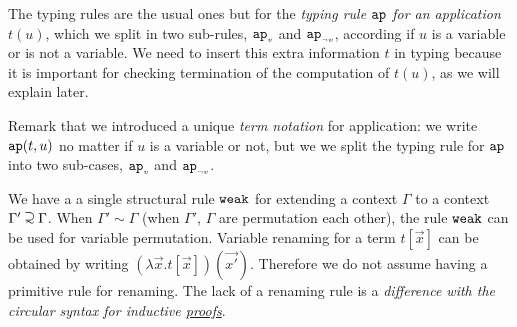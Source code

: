 The typing rules are the usual ones but for %
the \emph{typing rule ${\tt ap}$ for an application} $t(u)$, which we split in two sub-rules, ${{\tt ap}_{\mbox{\tiny $v$}}}$
and ${{\tt ap}_{\mbox{\tiny $\neg v$}}}$, according if $u$ is a variable or is not a variable.
We need to insert this extra information $t$ in typing because it is important for checking termination
of the computation of $t(u)$, as we will explain later.

Remark that we introduced a unique \emph{term notation}
for application: we write ${\tt ap}(t,u)$ no matter if $u$ is a variable or not, but we we split 
the typing rule for ${\tt ap}$ into two sub-cases, ${{\tt ap}_{\mbox{\tiny $v$}}}$ and ${{\tt ap}_{\mbox{\tiny $\neg v$}}}$.

We have a a single structural rule ${\tt weak}$ for extending a context $\Gamma$ to a context 
$\Gamma' \supseteqsim \Gamma$. When $\Gamma' \sim \Gamma$ (when 
$\Gamma'$, $\Gamma$ are permutation each other), 
the rule ${\tt weak}$ can be used for variable permutation.
Variable renaming for a term $t[\vec{x}]$ can be obtained by writing 
$(\lambda \vec{x}.t[\vec{x}])(\vec{x'})$. 
Therefore we do not assume having a primitive rule for renaming. 
The lack of a renaming rule is a 
\emph{difference with the circular syntax for inductive \underline{proofs}}.




